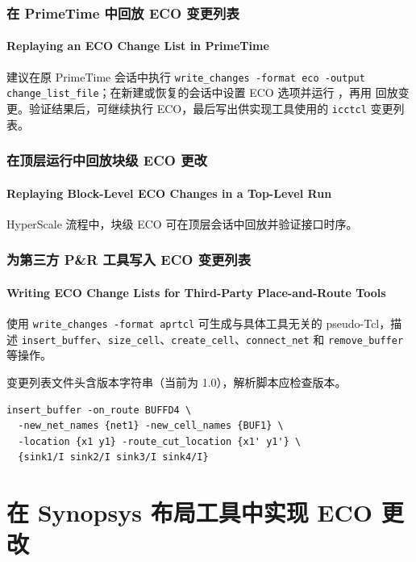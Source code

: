 \subsubsection{在 PrimeTime 中回放 ECO 变更列表}
\paragraph*{Replaying an ECO Change List in PrimeTime}

建议在原 PrimeTime 会话中执行 \texttt{write\_changes -format eco -output change\_list\_file}；在新建或恢复的会话中设置 ECO 选项并运行 ，再用  回放变更。验证结果后，可继续执行 ECO，最后写出供实现工具使用的 \texttt{icctcl} 变更列表。

\subsubsection{在顶层运行中回放块级 ECO 更改}
\paragraph*{Replaying Block-Level ECO Changes in a Top-Level Run}

HyperScale 流程中，块级 ECO 可在顶层会话中回放并验证接口时序。

\subsubsection{为第三方 P\&R 工具写入 ECO 变更列表}
\paragraph*{Writing ECO Change Lists for Third-Party Place-and-Route Tools}

使用 \texttt{write\_changes -format aprtcl} 可生成与具体工具无关的 pseudo-Tcl，描述 \texttt{insert\_buffer}、\texttt{size\_cell}、\texttt{create\_cell}、\texttt{connect\_net} 和 \texttt{remove\_buffer} 等操作。

变更列表文件头含版本字符串（当前为 1.0），解析脚本应检查版本。

\begin{lstlisting}
insert_buffer -on_route BUFFD4 \
  -new_net_names {net1} -new_cell_names {BUF1} \
  -location {x1 y1} -route_cut_location {x1' y1'} \
  {sink1/I sink2/I sink3/I sink4/I}
\end{lstlisting}

\section{在 Synopsys 布局工具中实现 ECO 更改}
